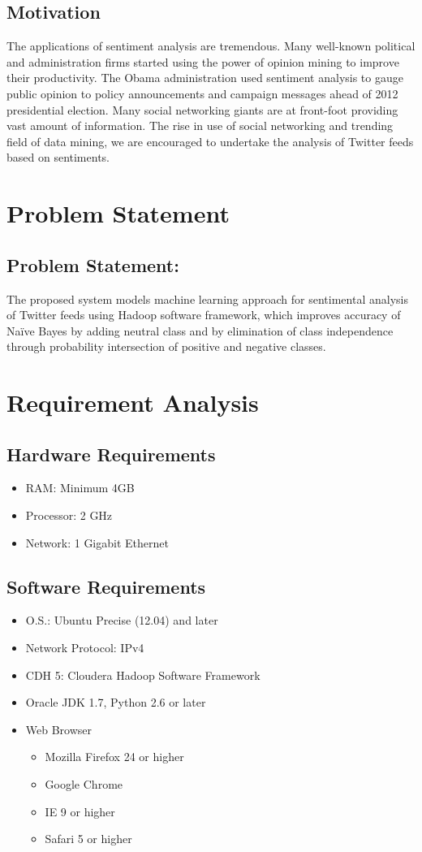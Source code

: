 \documentclass[a4paper,12pt]{report}
\begin{document}
		\section{Motivation}
		The applications of sentiment analysis are tremendous. Many well-known political and administration firms started using the power of opinion mining to improve their productivity. The Obama administration used sentiment analysis to gauge public opinion to policy announcements and campaign messages ahead of 2012 presidential election. Many social networking giants are at front-foot providing vast amount of information. The rise in use of social networking and trending field of data mining, we are encouraged to undertake the analysis of Twitter feeds based on sentiments.
		\chapter{Problem Statement}
		\section{Problem Statement:}
		The proposed system models machine learning approach for sentimental analysis of Twitter feeds using Hadoop software framework, which improves accuracy of Naïve Bayes by adding neutral class and by elimination of class independence through probability intersection of positive and negative classes.
		\chapter{Requirement Analysis}
		\section{Hardware Requirements}
		\begin{itemize}
			\item RAM: Minimum 4GB
			\item Processor: 2 GHz
			\item Network: 1 Gigabit Ethernet
		\end{itemize}
		
		\section{Software Requirements}
		\begin{itemize}
			\item O.S.: Ubuntu Precise (12.04) and later
			\item Network Protocol: IPv4
			\item CDH 5: Cloudera Hadoop Software Framework
			\item Oracle JDK 1.7, Python 2.6 or later
			\item Web Browser
			\begin{itemize}
				\item Mozilla Firefox 24 or higher
				\item Google Chrome
				\item IE 9 or higher
				\item Safari 5 or higher
			\end{itemize}
		\end{itemize}
\end{document}
